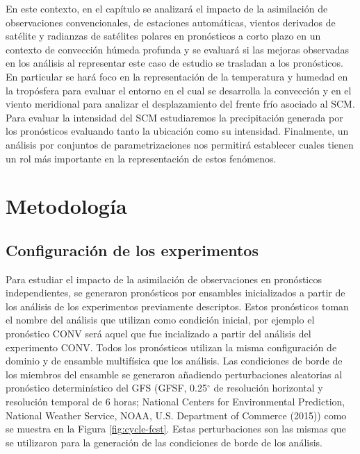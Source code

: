 \documentclass[12pt,oneside,a4paper]{reedthesis}
\begin{document}
En este contexto, en el capítulo se analizará el impacto de la asimilación de observaciones convencionales, de
estaciones automáticas, vientos derivados de satélite y radianzas de satélites polares en pronósticos a corto plazo en un contexto de convección húmeda profunda y se evaluará si las mejoras observadas en los análisis al representar este caso de estudio se trasladan a los pronósticos. En particular se hará foco en la representación de la temperatura y humedad en la tropósfera para evaluar el entorno en el cual se desarrolla la convección y en el viento meridional para analizar el desplazamiento del frente frío asociado al SCM. Para evaluar la intensidad del SCM estudiaremos la precipitación generada por los pronósticos evaluando tanto la ubicación como su intensidad. Finalmente, un análisis por conjuntos de parametrizaciones nos permitirá establecer cuales tienen un rol más importante en la representación de estos fenómenos.

\hypertarget{metodologuxeda-1}{%
\section{Metodología}\label{metodologuxeda-1}}

\hypertarget{configuraciuxf3n-de-los-experimentos}{%
\subsection{Configuración de los experimentos}\label{configuraciuxf3n-de-los-experimentos}}

Para estudiar el impacto de la asimilación de observaciones en pronósticos independientes, se generaron pronósticos por ensambles inicializados a partir de los análisis de los experimentos previamente descriptos. Estos pronósticos toman el nombre del análisis que utilizan como condición inicial, por ejemplo el pronóstico CONV será aquel que fue incializado a partir del análisis del experimento CONV. Todos los pronósticos utilizan la misma configuración de dominio y de ensamble multifísica que los análisis. Las condiciones de borde de los miembros del ensamble se generaron añadiendo perturbaciones aleatorias al pronóstico determinístico del GFS (GFSF, 0.25\(^{\circ}\) de resolución horizontal y resolución temporal de 6 horas; National Centers for Environmental Prediction, National Weather Service, NOAA, U.S. Department of Commerce (2015)) como se muestra en la Figura \ref{fig:cycle-fcst}. Estas perturbaciones son las mismas que se utilizaron para la generación de las condiciones de borde de los análisis.
\end{document}
